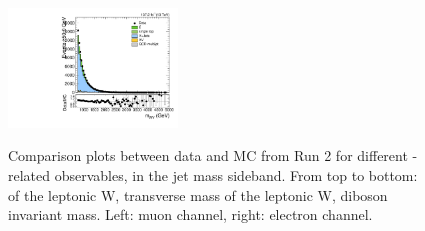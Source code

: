 \begin{figure}[htbp]
  \includegraphics[width=0.4\textwidth]{fig/analysis/SB_b1_e_allP_allC_allE_Run2_mWV.pdf}\\
  \caption{
    Comparison plots between data and MC from Run 2 for different \Wlep-related observables, in the jet mass sideband.
    From top to bottom: \pt of the leptonic W, transverse mass of the leptonic W, diboson invariant mass.
    Left: muon channel, right: electron channel.
  }
  \label{fig:SB_controlPlotsRun2_2}
\end{figure}

